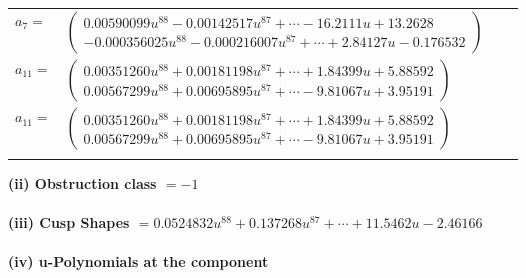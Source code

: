 \documentclass[1p]{elsarticle_modified}
\theoremstyle{definition}
\begin{document}
\begin{tabular}{m{7pt} m{180pt} m{7pt} m{180pt} }
\flushright $a_{7}=$&$\begin{pmatrix}0.00590099 u^{88}-0.00142517 u^{87}+\cdots-16.2111 u+13.2628\\-0.000356025 u^{88}-0.000216007 u^{87}+\cdots+2.84127 u-0.176532\end{pmatrix}$ \\
\flushright $a_{11}=$&$\begin{pmatrix}0.00351260 u^{88}+0.00181198 u^{87}+\cdots+1.84399 u+5.88592\\0.00567299 u^{88}+0.00695895 u^{87}+\cdots-9.81067 u+3.95191\end{pmatrix}$\\ \flushright $a_{11}=$&$\begin{pmatrix}0.00351260 u^{88}+0.00181198 u^{87}+\cdots+1.84399 u+5.88592\\0.00567299 u^{88}+0.00695895 u^{87}+\cdots-9.81067 u+3.95191\end{pmatrix}$\\&\end{tabular}
\flushleft \textbf{(ii) Obstruction class $= -1$}\\~\\
\flushleft \textbf{(iii) Cusp Shapes $= 0.0524832 u^{88}+0.137268 u^{87}+\cdots+11.5462 u-2.46166$}\\~\\
\newpage\renewcommand{\arraystretch}{1}
\flushleft \textbf{(iv) u-Polynomials at the component}\newline \\
\end{document}
